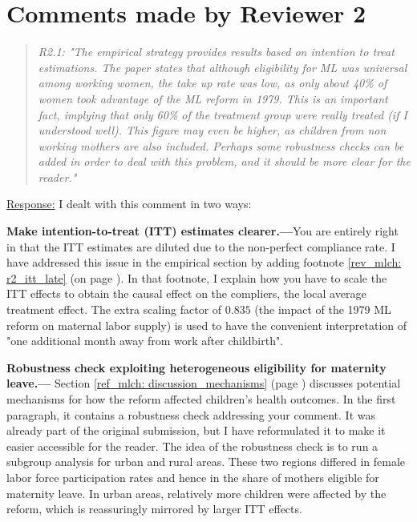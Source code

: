 
\clearpage
\section{Comments made by Reviewer 2}


\bigskip
{}
\begin{quote}
	\textit{R2.1: "The empirical strategy provides results based on intention to treat estimations. The paper states that although eligibility for ML was universal among working women, the take up rate was low, as only about 40\% of women took advantage of the ML reform in 1979. This is an important fact, implying that only 60\% of the treatment group were really treated (if I understood well). This figure may even be higher, as children from non working mothers are also included. Perhaps some robustness checks can be added in order to deal with this problem, and it should be more clear for the reader."}
\end{quote}
\underline{Response:} I dealt with this comment in two ways: 

\textbf{Make intention-to-treat (ITT) estimates clearer.---}You are entirely right in that the ITT estimates are diluted due to the non-perfect compliance rate. I have addressed this issue in the empirical section by adding footnote \ref{rev_mlch: r2_itt_late} (on page \pageref{rev_mlch: r2_itt_late}). In that footnote, I explain how you have to scale the ITT effects to obtain the causal effect on the compliers, the local average treatment effect. The extra scaling factor of $0.835$ (the impact of the 1979 ML reform on maternal labor supply) is used to have the convenient interpretation of "one additional month away from work after childbirth". 

\textbf{Robustness check exploiting heterogeneous eligibility for maternity leave.---} Section \ref{ref_mlch: discussion_mechanisms} (page \pageref{ref_mlch: discussion_mechanisms}) discusses potential mechanisms for how the reform affected children's health outcomes. In the first paragraph, it contains a robustness check addressing your comment. It was already part of the original submission, but I have reformulated it to make it easier accessible for the reader. The idea of the robustness check is to run a subgroup analysis for urban and rural areas. These two regions differed in female labor force participation rates and hence in the share of mothers eligible for maternity leave. In urban areas, relatively more children were affected by the reform, which is reassuringly mirrored by larger ITT effects.





